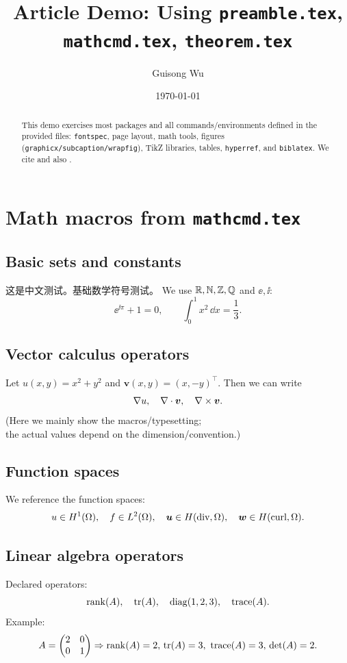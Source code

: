 \documentclass[11pt,a4paper]{article}
\title{Article Demo: Using \texttt{preamble.tex}, \texttt{mathcmd.tex}, \texttt{theorem.tex}}
\author{Guisong Wu}
\date{\today}
\begin{document}
\maketitle

\begin{abstract}
This demo exercises most packages and all commands/environments defined in the provided files:
\texttt{fontspec}, page layout, math tools, figures (\texttt{graphicx/subcaption/wrapfig}),
TikZ libraries, tables, \texttt{hyperref}, and \texttt{biblatex}.
We cite \textcite{lamport1994} and also \parencite{einstein1905}.
\end{abstract}

\tableofcontents
\newpage

\section{Math macros from \texttt{mathcmd.tex}}
\subsection{Basic sets and constants}
这是中文测试。基础数学符号测试。
We use $\mathbb{R},\mathbb{N},\mathbb{Z},\mathbb{Q}$ and $\ee,\ii$:
\[
  \ee^{\ii\pi}+1=0,\qquad
  \int_0^1 x^2\,\dd x=\frac13.
\]

\subsection{Vector calculus operators}
Let $u(x,y)=x^2+y^2$ and $\bm{v}(x,y)=(x,-y)^\top$.
Then we can write
\[
  \nabla u,\quad
  \nabla\cdot \bm{v},\quad
  \nabla\times \bm{v}.
\]
(Here we mainly show the macros/typesetting; \\
the actual values depend on the dimension/convention.)

\subsection{Function spaces}
We reference the function spaces:
\[
  u\in H^1(\Omega),\quad
  f\in L^2(\Omega),\quad
  \bm{u}\in H(\text{div},\Omega),\quad
  \bm{w}\in H(\text{curl},\Omega).
\]

\subsection{Linear algebra operators}
Declared operators:
\[
  \operatorname{rank}(A),\quad \operatorname{tr}(A),\quad \operatorname{diag}(1,2,3),\quad \operatorname{trace}(A).
\]
Example:
\[
  A=\begin{pmatrix}2&0\\0&1\end{pmatrix}
  \Rightarrow \rank(A)=2,\, \tr(A)=3,\ \trace(A)=3,\,\det(A)=2.
\]
\end{document}
